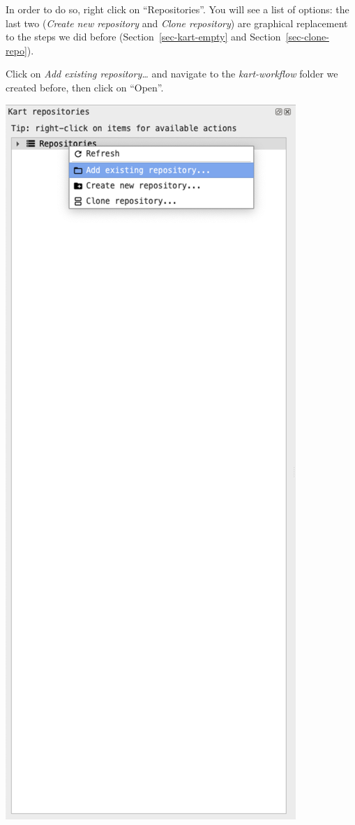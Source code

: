 \documentclass[
  letterpaper,
  DIV=11,
  numbers=noendperiod]{scrartcl}
\begin{document}
In order to do so, right click on ``Repositories''. You will see a list
of options: the last two (\emph{Create new repository} and \emph{Clone
repository}) are graphical replacement to the steps we did before
(Section~\ref{sec-kart-empty} and Section~\ref{sec-clone-repo}).

Click on \emph{Add existing repository\ldots{}} and navigate to the
\emph{kart-workflow} folder we created before, then click on ``Open''.

\begin{center}
\includegraphics{img/kart-panel-right-click.png}
\end{center}
\end{document}
